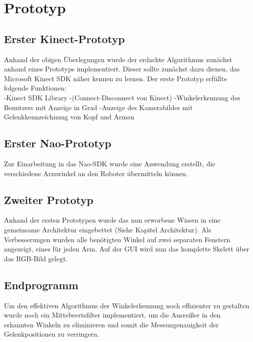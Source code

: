 \section{Prototyp}
\subsection{Erster Kinect-Prototyp}
Anhand der obigen Überlegungen wurde der erdachte Algorithmus zunächst anhand eines Prototyps implementiert. Dieser sollte zunächst dazu dienen, das Microsoft Kinect SDK näher kennen zu lernen. Der erste Prototyp erfüllte folgende Funktionen:\\
-Kinect SDK Library
-(Connect-Disconnect von Kinect)
-Winkelerkennung des Benutzers mit Anzeige in Grad
-Anzeige des Kamerabildes mit Gelenkkennzeichnung von Kopf und Armen

\subsection{Erster Nao-Prototyp}
Zur Einarbeitung in das Nao-SDK wurde eine Anwendung erstellt, die verschiedene Armwinkel an den Roboter übermitteln können.


\subsection{Zweiter Prototyp}
Anhand der ersten Prototypen wurde das nun erworbene Wissen in eine gemeinsame Architektur eingebettet (Siehe Kapitel Architektur). Als Verbesserungen wurden alle benötigten Winkel auf zwei separaten Fenstern angezeigt, eines für jeden Arm. Auf der GUI wird nun das komplette Skelett über das RGB-Bild gelegt.


\subsection{Endprogramm}
Um den effektiven Algorithmus der Winkelerkennung noch effizienter zu gestalten wurde noch ein Mittelwertsfilter implementiert, um die Ausreißer in den erkannten Winkeln zu eliminieren und somit die Messungenauigkeit der Gelenkpositionen zu verringern.


